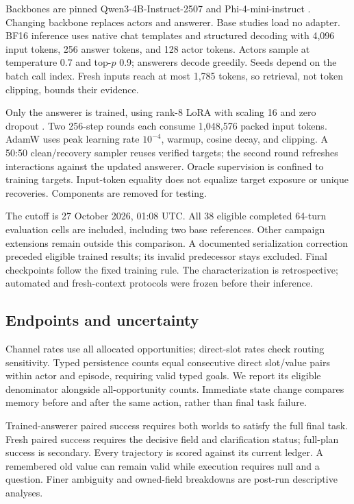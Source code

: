 \documentclass{svproc}
\begin{document}
Backbones are pinned Qwen3-4B-Instruct-2507 and Phi-4-mini-instruct \cite{qwen,phi}. Changing backbone replaces actors and answerer. Base studies load no adapter. BF16 inference uses native chat templates and structured decoding with 4,096 input tokens, 256 answer tokens, and 128 actor tokens. Actors sample at temperature 0.7 and top-$p$ 0.9; answerers decode greedily. Seeds depend on the batch call index. Fresh inputs reach at most 1,785 tokens, so retrieval, not token clipping, bounds their evidence.

Only the answerer is trained, using rank-8 LoRA with scaling 16 and zero dropout \cite{lora}. Two 256-step rounds each consume 1,048,576 packed input tokens. AdamW uses peak learning rate $10^{-4}$, warmup, cosine decay, and clipping. A 50:50 clean/recovery sampler reuses verified targets; the second round refreshes interactions against the updated answerer. Oracle supervision is confined to training targets. Input-token equality does not equalize target exposure or unique recoveries. Components are removed for testing.

The cutoff is 27 October 2026, 01:08 UTC. All 38 eligible completed 64-turn evaluation cells are included, including two base references. Other campaign extensions remain outside this comparison. A documented serialization correction preceded eligible trained results; its invalid predecessor stays excluded. Final checkpoints follow the fixed training rule. The characterization is retrospective; automated and fresh-context protocols were frozen before their inference.

\subsection{Endpoints and uncertainty}
Channel rates use all allocated opportunities; direct-slot rates check routing sensitivity. Typed persistence counts equal consecutive direct slot/value pairs within actor and episode, requiring valid typed goals. We report its eligible denominator alongside all-opportunity counts. Immediate state change compares memory before and after the same action, rather than final task failure.

Trained-answerer paired success requires both worlds to satisfy the full final task. Fresh paired success requires the decisive field and clarification status; full-plan success is secondary. Every trajectory is scored against its current ledger. A remembered old value can remain valid while execution requires null and a question. Finer ambiguity and owned-field breakdowns are post-run descriptive analyses.
\end{document}

